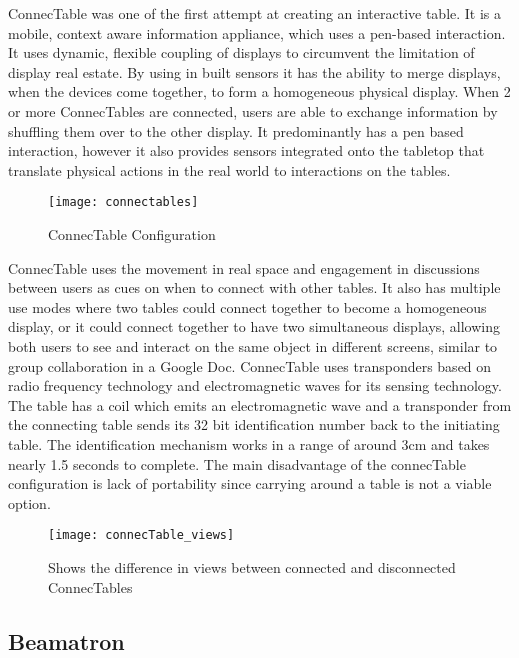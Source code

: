 ConnecTable\cite{connectables} was one of the first attempt at creating
an interactive table. It is a mobile, context aware
information appliance, which uses a pen-based interaction. It uses
dynamic, flexible coupling of displays to circumvent the limitation
of display real estate. By using in built sensors it has the ability
to merge displays, when the devices come together, to form a homogeneous physical
display. When 2 or more ConnecTables are connected, users are able
to exchange information by shuffling them over to the other display.
It predominantly has a pen based interaction, however it also provides sensors
integrated onto the tabletop that translate physical actions in the
real world to interactions on the tables. 
\begin{figure}[H]
\centering
\texttt{[image: connectables]}

\protect\caption{ConnecTable Configuration}
\end{figure}
ConnecTable uses the movement in real space and engagement in discussions
between users as cues on when to connect with other tables. It also
has multiple use modes where two tables could connect together to
become a homogeneous display, or it could connect together to have
two simultaneous displays, allowing both users to see and interact on
the same object in different screens, similar to group collaboration
in a Google Doc. ConnecTable uses transponders based on radio frequency
technology and electromagnetic waves for its sensing technology. The
table has a coil which emits an electromagnetic wave and a transponder
from the connecting table sends its 32 bit identification number
back to the initiating table. The identification mechanism works in
a range of around 3cm and takes nearly 1.5 seconds to complete.
The main disadvantage of the connecTable configuration is lack of portability since carrying around a table is not a viable option.

\begin{figure}[h]
\centering
\texttt{[image: connecTable\_views]}
\protect\caption{Shows the difference in views between connected and disconnected ConnecTables}
\end{figure}

\subsection{Beamatron} \label{beamatron}

